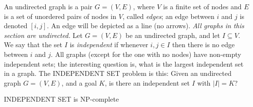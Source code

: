 \documentclass[12pt]{article}
\begin{document}
An undirected graph is a pair $G = (V, E)$, where $V$ is a finite set of nodes and $E$ is a set of unordered pairs of nodes in $V$, called \textit{edges}; an edge between $i$ and $j$ is denoted $[i, j]$. An edge will be depicted as a line (no arrows). \textit{All graphs in this section are undirected.}
Let $G = (V, E)$ be an undirected graph, and let $I \subseteq V$. We say that the set $I$ is \textit{independent} if whenever $i, j \in I$ then there is no edge between $i$ and $j$. All graphs (except for the one with no nodes) have non-empty independent sets; the interesting question is, what is the largest independent set in a graph. The \textsc{INDEPENDENT SET} problem is this: Given an undirected graph $G = (V, E)$, and a goal $K$, is there an independent set $I$ with $|I| = K$?
\begin{defbox}[Theorem]
  INDEPENDENT SET is NP-complete
\end{defbox}
\end{document}

